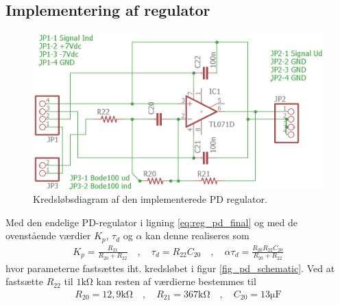 \subsection{Implementering af regulator}
\begin{figure}[h!]
\centering
\includegraphics[width=.8\textwidth]{billeder/pd_schematic.png}
\caption{Kredsløbsdiagram af den implementerede PD regulator.}
\label{fig:pd_schematic}
\end{figure}
Med den endelige PD-regulator i ligning \ref{eq:reg_pd_final} og med de ovenstående værdier $K_p$, $\tau_d$ og $\alpha$ kan denne realiseres \cite[s. 349]{Reg2015} som
\begin{align}
K_p = \frac{R_{21}}{R_{20} + R_{22}} \quad , \quad \tau_d = R_{22}C_{20} \quad, \quad \alpha\tau_d = \frac{R_{20} R_{22} C_{20}}{R_{20} + R_{22}}
\end{align}
hvor parameterne fastsættes iht. kredsløbet i figur \ref{fig_pd_schematic}.
Ved at fastsætte $R_{22}$ til $1\si{\kilo\ohm}$ kan resten af værdierne bestemmes til
\begin{align}
R_{20}=12,9\si{\kilo\ohm} \quad, \quad R_{21}=367\si{\kilo\ohm} \quad, \quad C_{20} = 13\si{\micro\farad}
\end{align}

